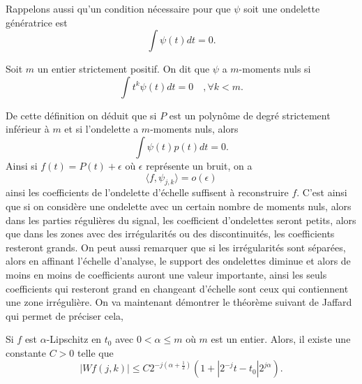 Rappelons aussi qu'un condition nécessaire pour que $\psi$ soit une ondelette génératrice est
\begin{equation*}
	\int \psi (t)dt = 0.
\end{equation*}
\begin{definition}
	Soit $m$ un entier strictement positif.
	On dit que $\psi$ a $m$-moments nuls si
	\begin{equation*}
		\int t^k \psi(t)dt = 0 \quad, \forall k < m.
	\end{equation*}
\end{definition}
De cette définition on déduit que si $P$ est un polynôme de degré strictement inférieur à $m$ et si l'ondelette a $m$-moments nuls, alors
\begin{equation}\label{eq:momPol}
	\int \psi(t) p(t) dt = 0.
\end{equation}
Ainsi si $f(t) = P(t) +\epsilon$ où $\epsilon$ représente un bruit, on a 
\begin{equation*}
	\langle f, \psi_{j,k} \rangle = o(\epsilon)
\end{equation*}
ainsi les coefficients de l'ondelette d'échelle suffisent à reconstruire $f$.
C'est ainsi que si on considère une ondelette avec un certain nombre de moments nuls, alors dans les parties régulières du signal, les coefficient d'ondelettes seront petits, alors que dans les zones avec des irrégularités ou des discontinuités, les coefficients resteront grands.
On peut aussi remarquer que si les irrégularités sont séparées, alors en affinant l'échelle d'analyse, le support des ondelettes diminue et alors de moins en moins de coefficients auront une valeur importante, ainsi les seuls coefficients qui resteront grand en changeant d'échelle sont ceux qui contiennent une zone irrégulière. 
\newline
On va maintenant démontrer le théorème suivant de Jaffard qui permet de préciser cela,
\begin{theoreme}\label{th:Jaffard}
	Si $f$ est $\alpha$-Lipschitz en $t_0$ avec $0 < \alpha \leq m$ où $m$ est un entier.
	Alors, il existe une constante $C >0$ telle que 
	\begin{equation*}
		|Wf(j, k)| \leq C2^{-j(\alpha + \frac{1}{2})}(1 + |2^{-j}t - t_0|2^{j\alpha}).
	\end{equation*}
\end{theoreme}
